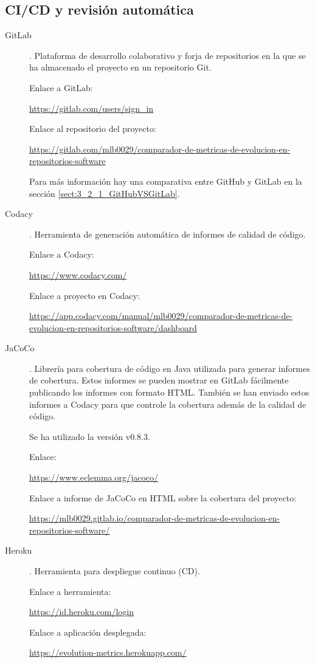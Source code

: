 \subsection{CI/CD y revisión automática}
\begin{description}
	\item[GitLab]. Plataforma de desarrollo colaborativo y forja de repositorios en la que se ha almacenado el proyecto en un repositorio Git.
	
		Enlace a GitLab:
		
		\url{https://gitlab.com/users/sign_in}
		
		Enlace al repositorio del proyecto:
		
		\url{https://gitlab.com/mlb0029/comparador-de-metricas-de-evolucion-en-repositorios-software}
		
		Para más información hay una comparativa entre GitHub y GitLab en la sección \ref{sect:3_2_1_GitHubVSGitLab}.
		
	\item[Codacy]. Herramienta de generación automática de informes de calidad de código.
	
		 Enlace a Codacy:
		 
		 \url{https://www.codacy.com/}
		 
		 Enlace a proyecto en Codacy: 
		 
		 \url{https://app.codacy.com/manual/mlb0029/comparador-de-metricas-de-evolucion-en-repositorios-software/dashboard}
	
	\item[JaCoCo]. Librería para cobertura de código en Java utilizada para generar informes de cobertura. Estos informes se pueden mostrar en GitLab fácilmente publicando los informes con formato HTML. También se han enviado estos informes a Codacy para que controle la cobertura además de la calidad de código.
	
		Se ha utilizado la versión v0.8.3.
		
		Enlace:
		
		\url{https://www.eclemma.org/jacoco/}
		
		Enlace a informe de JaCoCo en HTML sobre la cobertura del proyecto:
		
		\url{https://mlb0029.gitlab.io/comparador-de-metricas-de-evolucion-en-repositorios-software/}
	
	\item[Heroku]. Herramienta para despliegue continuo (CD).
	
		Enlace a herramienta:
		
		\url{https://id.heroku.com/login}
		
		Enlace a aplicación desplegada:
		
		\url{https://evolution-metrics.herokuapp.com/}
	
\end{description}
